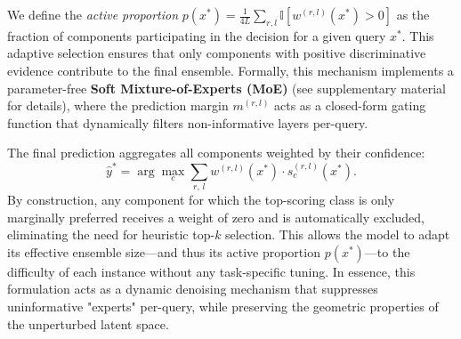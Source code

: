 \documentclass[sigconf,review,anonymous,9pt,table]{acmart}
\begin{document}
We define the \emph{active proportion} $p(x^*) = \frac{1}{4L} \sum_{r,l} \mathbb{I}[w^{(r,l)}(x^*) > 0]$ as the fraction of components participating in the decision for a given query $x^*$. 
This adaptive selection ensures that only components with positive discriminative evidence contribute to the final ensemble. Formally, this mechanism implements a parameter-free \textbf{Soft Mixture-of-Experts (MoE)} (see supplementary material for details), where the prediction margin $m^{(r,l)}$ acts as a closed-form gating function that dynamically filters non-informative layers per-query.

The final prediction aggregates all components weighted by their confidence:
\begin{equation}
  \hat{y}^* = \arg\max_c \sum_{r,\,l} w^{(r,l)}(x^*) \cdot s_c^{(r,l)}(x^*).
  \label{eq:final}
\end{equation}
By construction, any component for which the top-scoring class is only marginally preferred receives a weight of zero and is automatically excluded, eliminating the need for heuristic top-$k$ selection. This allows the model to adapt its effective ensemble size—and thus its active proportion $p(x^*)$—to the difficulty of each instance without any task-specific tuning.
In essence, this formulation acts as a dynamic denoising mechanism that suppresses uninformative "experts" per-query, while preserving the geometric properties of the unperturbed latent space.
\end{document}
